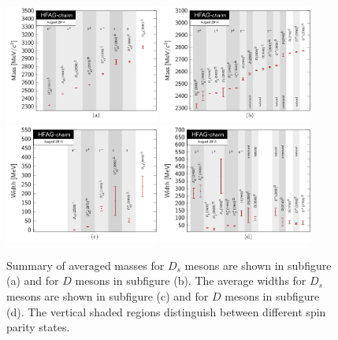 \begin{figure}[htb!]
\begin{centering}
\includegraphics[width=0.45\textwidth]{./figures/charm/Dsmasses}
\quad
\includegraphics[width=0.45\textwidth]{./figures/charm/Dmasses}\\
\includegraphics[width=0.45\textwidth]{./figures/charm/Dswidths}
\quad
\includegraphics[width=0.45\textwidth]{./figures/charm/Dwidths}

\caption{\label{fig:charm:spect:1}  Summary of averaged masses for $D_{s}$ mesons are shown in subfigure (a) and for $D$ mesons in subfigure (b). The average widths for $D_{s}$ mesons are shown in subfigure (c) and for $D$ mesons in subfigure (d). The vertical shaded regions distinguish between different spin parity states.}
\end{centering}
\end{figure}

